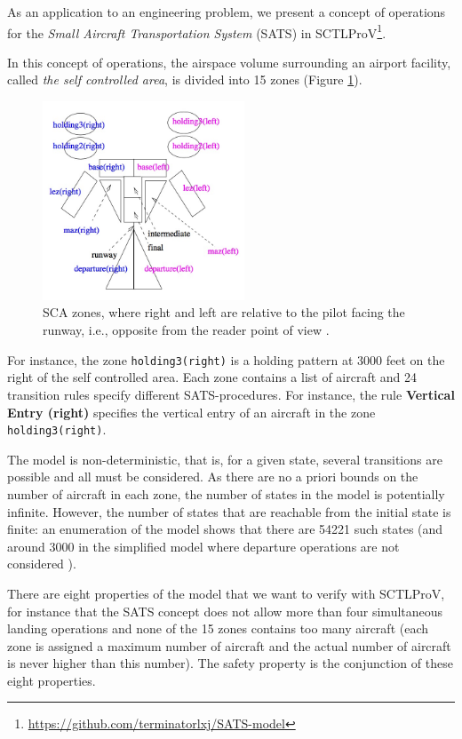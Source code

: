 \documentclass[runningheads]{llncs}
\begin{document}
\begin{example} \label{expl:sats}
	As an application to an engineering problem, we present
	a concept of operations for the {\em Small Aircraft Transportation System} 
	(\textsf{SATS}) 
	\cite{MunozDC04,nasasats04}
	in \textsf{SCTLProV}\footnote{\url{https://github.com/terminatorlxj/SATS-model}}.
	
	In this concept of operations, the airspace volume surrounding an
	airport facility, called {\em the self controlled area}, is divided into
	15 zones (Figure \ref{fig:example:sats:sca}).
	\begin{figure}
		\centering
		\includegraphics[width=6cm]{./sca.jpg}
		\caption{SCA zones, where right and left are relative to the pilot facing the runway, i.e., opposite from the reader point of view \cite{MunozDC04}.}
		\label{fig:example:sats:sca}
	\end{figure}
	For instance, the zone {\tt holding3(right)} is a holding pattern at
	3000 feet on the right of the self controlled area.
	Each zone contains a list of aircraft and 24 transition rules
	specify different SATS-procedures.
	For instance, the rule \textbf{Vertical Entry (right)}
	specifies the vertical entry of an aircraft in the zone
	{\tt holding3(right)}. 
	
	The model is
	non-deterministic, that is, for a given state, several transitions are
	possible and all must be considered.  As there are no a
	priori bounds on the number of aircraft in each zone, the number of
	states in the model is potentially infinite. However, the number of
	states that are reachable from the initial state is finite: 
	an enumeration of the model shows that there are 54221 such states (and
	around 3000 in the simplified model where departure operations are not
	considered \cite{MunozDC04}).
	
	There are eight properties of the model that we want to 
	verify with \textsf{SCTLProV}, for instance that 
	the \textsf{SATS} concept does not allow more than four simultaneous 
	landing operations and none of the 
	15 zones contains too many aircraft (each zone is
	assigned a maximum number of aircraft and the actual number of
	aircraft is never higher than this number).
	The safety property is the conjunction of these eight properties. 
	

\end{example}
\end{document}
